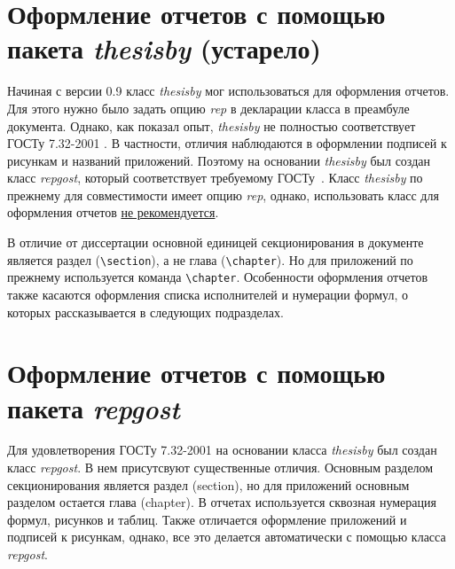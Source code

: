 \section{Оформление отчетов с помощью пакета {\itshape thesisby} (устарело)}\label{sec:rep}

Начиная с версии 0.9 класс {\itshape thesisby} мог использоваться для оформления отчетов. Для этого нужно было задать опцию {\itshape rep} в декларации класса в преамбуле документа. Однако, как показал опыт, {\itshape thesisby} не полностью соответствует ГОСТу 7.32-2001 \cite{gost7-32}. В частности, отличия наблюдаются в оформлении подписей к рисункам и названий приложений. Поэтому на основании {\itshape thesisby} был создан класс {\itshape repgost}, который соответствует требуемому ГОСТу~\cite{repgost}. Класс {\itshape thesisby} по прежнему для совместимости имеет опцию {\itshape rep}, однако, использовать класс для оформления отчетов \underline{не рекомендуется}.

В отличие от диссертации основной единицей секционирования в документе является раздел (\verb|\section|), а не глава (\verb|\chapter|). Но для приложений по прежнему используется команда \verb|\chapter|. Особенности оформления отчетов также касаются оформления списка исполнителей и нумерации формул, о которых рассказывается в следующих подразделах.

\section{Оформление отчетов с помощью пакета {\itshape repgost}}\label{sec:repgost}

Для удовлетворения ГОСТу 7.32-2001 на основании класса {\itshape thesisby} был создан класс {\itshape repgost}. В нем присутсвуют существенные отличия. Основным разделом секционирования является раздел (section), но для приложений основным разделом остается глава (chapter). В отчетах используется сквозная нумерация формул, рисунков и таблиц. Также отличается оформление приложений и подписей к рисункам, однако, все это делается автоматически с помощью класса {\itshape repgost}.

